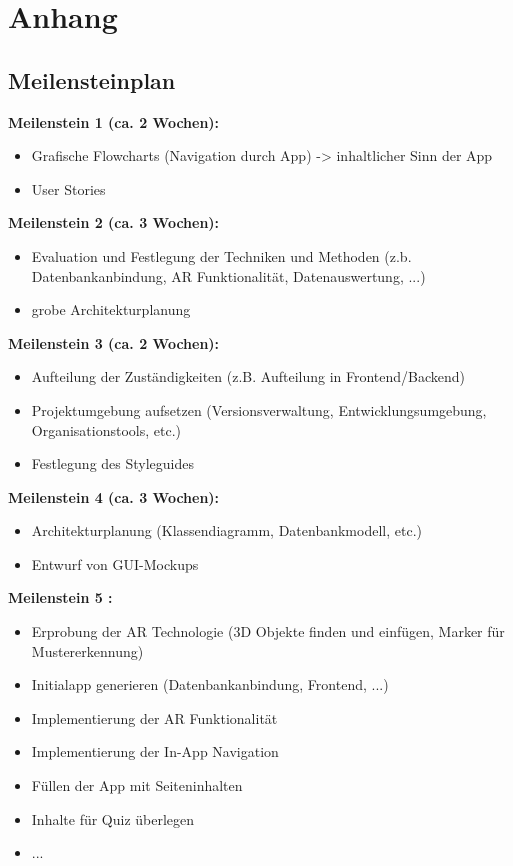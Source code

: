 \chapter{Anhang}\label{app:anhang}
\section{Meilensteinplan}\label{Meilensteinplan}
\textbf{Meilenstein 1  (ca. 2 Wochen):}
\begin{itemize}
\item Grafische Flowcharts (Navigation durch App) -> inhaltlicher Sinn der App
\item User Stories
\end{itemize}

\textbf{Meilenstein 2  (ca. 3 Wochen):}
\begin{itemize}
\item Evaluation und Festlegung der Techniken und Methoden (z.b. Datenbankanbindung, AR Funktionalität, Datenauswertung, ...)
\item grobe Architekturplanung
\end{itemize}

\textbf{Meilenstein 3  (ca. 2 Wochen):}
\begin{itemize}
\item Aufteilung der Zuständigkeiten (z.B. Aufteilung in Frontend/Backend)
\item Projektumgebung aufsetzen (Versionsverwaltung, Entwicklungsumgebung, Organisationstools, etc.)
\item Festlegung des Styleguides
\end{itemize}

\textbf{Meilenstein 4  (ca. 3 Wochen):}
\begin{itemize}
\item Architekturplanung (Klassendiagramm, Datenbankmodell, etc.)
\item Entwurf von GUI-Mockups
\end{itemize}

\textbf{Meilenstein 5 :}
\begin{itemize}
\item Erprobung der AR Technologie (3D Objekte finden und einfügen, Marker für Mustererkennung)
\item Initialapp generieren (Datenbankanbindung, Frontend, ...)
\item Implementierung der AR Funktionalität
\item Implementierung der In-App Navigation
\item Füllen der App mit Seiteninhalten
\item Inhalte für Quiz überlegen
\item ...
\end{itemize}


